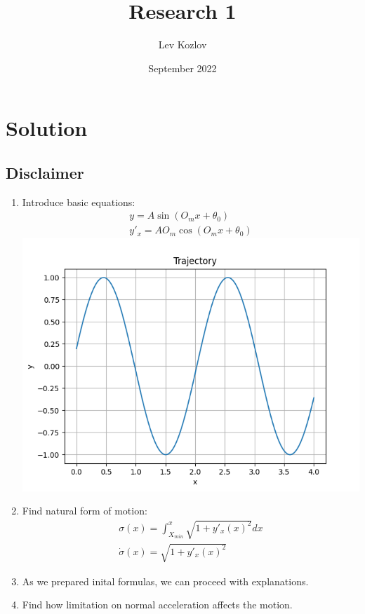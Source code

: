 \documentclass{article}
\title{Research 1}
\author{Lev Kozlov}
\date{September 2022}
\begin{document}
\maketitle

\section*{Solution}

\subsection*{Disclaimer}

\begin{enumerate}
      \item Introduce basic equations:
            \begin{align}
                  y = A \sin(O_m x + \theta_0) \\
                  y'_x = A O_m \cos(O_m x + \theta_0)
            \end{align}
            \includegraphics[width=\linewidth]{trajectory.png}
      \item Find natural form of motion:
            \begin{align}
                  \sigma(x) = \int_{X_{min}}^{x} \sqrt{1 + {y'_{x}(x)}^2} dx \\
                  \dot{\sigma}(x) = \sqrt{1 + {y'_{x}(x)}^2}
            \end{align}
      \item As we prepared inital formulas, we can proceed with explanations.
      \item Find how limitation on normal acceleration affects the motion.

\end{enumerate}
\end{document}
